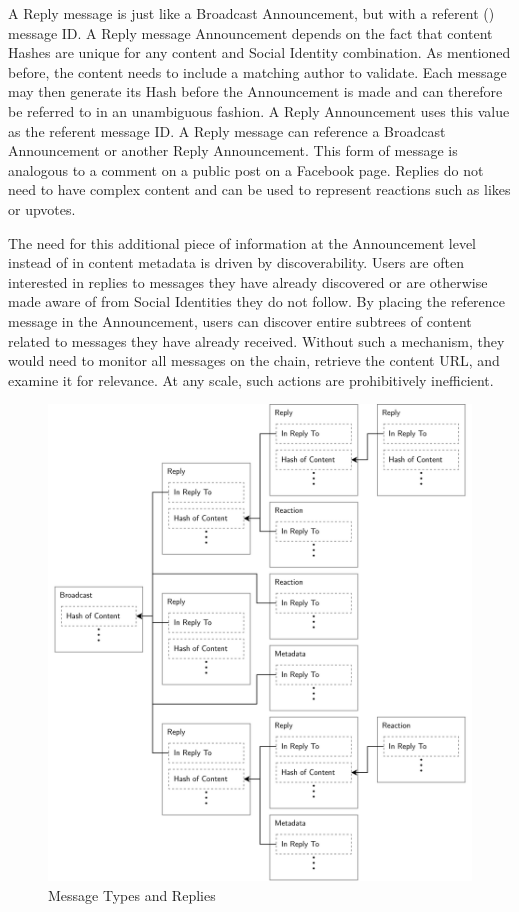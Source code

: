\documentclass[12pt,letterpaper]{article}
\begin{document}
A Reply message is just like a Broadcast Announcement, but with a referent () message ID. A Reply message Announcement depends on the fact that content Hashes are
unique for any content and Social Identity combination. As mentioned before, the content
needs to include a matching author to validate. Each message may then generate its Hash
before the Announcement is made and can therefore be referred to in an unambiguous
fashion. A Reply Announcement uses this value as the referent message ID. A Reply message
can reference a Broadcast Announcement or another Reply Announcement. This form of message
is analogous to a comment on a public post on a Facebook page. Replies do not need to have
complex content and can be used to represent reactions such as likes or upvotes.

The need for this additional piece of information at the Announcement level instead of in
content metadata is driven by discoverability. Users are often interested in replies to
messages they have already discovered or are otherwise made aware of from Social
Identities they do not follow. By placing the reference message in the Announcement, users
can discover entire subtrees of content related to messages they have already received.
Without such a mechanism, they would need to monitor all messages on the chain, retrieve
the content URL, and examine it for relevance. At any scale, such actions are
prohibitively inefficient.

\begin{figure}
	\includegraphics[width=\linewidth]{figures/Message Types and Replies.png}
	\caption{Message Types and Replies}
	\label{fig:6}
\end{figure}
\end{document}
